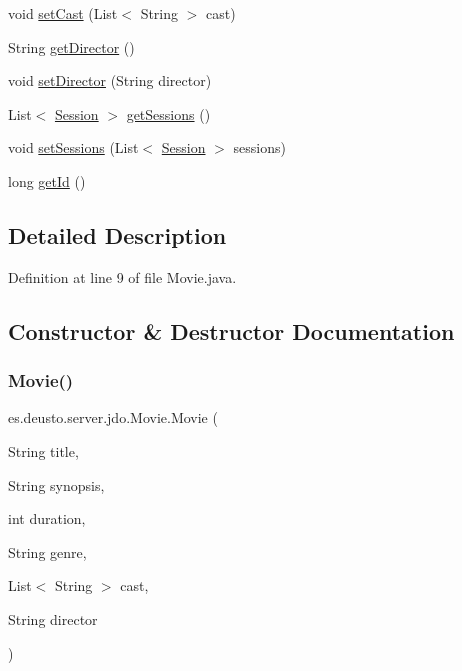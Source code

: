 \begin{DoxyCompactItemize}
\item 
void \mbox{\hyperlink{classes_1_1deusto_1_1server_1_1jdo_1_1_movie_aab7fa1af2944677769c47300ea061e3b}{set\+Cast}} (List$<$ String $>$ cast)
\item 
String \mbox{\hyperlink{classes_1_1deusto_1_1server_1_1jdo_1_1_movie_a4fae4f67472a1a789c1b926ce5417fe1}{get\+Director}} ()
\item 
void \mbox{\hyperlink{classes_1_1deusto_1_1server_1_1jdo_1_1_movie_a2739245f04bc6627b5a00ddeb6fba0fc}{set\+Director}} (String director)
\item 
List$<$ \mbox{\hyperlink{classes_1_1deusto_1_1server_1_1jdo_1_1_session}{Session}} $>$ \mbox{\hyperlink{classes_1_1deusto_1_1server_1_1jdo_1_1_movie_a8d94f72339ed5601515e139de313e181}{get\+Sessions}} ()
\item 
void \mbox{\hyperlink{classes_1_1deusto_1_1server_1_1jdo_1_1_movie_a76eb3668db335d824abc947053584699}{set\+Sessions}} (List$<$ \mbox{\hyperlink{classes_1_1deusto_1_1server_1_1jdo_1_1_session}{Session}} $>$ sessions)
\item 
long \mbox{\hyperlink{classes_1_1deusto_1_1server_1_1jdo_1_1_movie_a4d2758ed2b7a03bd95646f67c046e043}{get\+Id}} ()
\end{DoxyCompactItemize}


\subsection{Detailed Description}


Definition at line 9 of file Movie.\+java.



\subsection{Constructor \& Destructor Documentation}
\mbox{\label{classes_1_1deusto_1_1server_1_1jdo_1_1_movie_ab4223192a852a37abd679f4d0a6a11c4}} 
\subsubsection{\texorpdfstring{Movie()}{Movie()}\hspace{0.1cm}{\footnotesize\ttfamily [1/2]}}
{\footnotesize\ttfamily es.\+deusto.\+server.\+jdo.\+Movie.\+Movie (\begin{DoxyParamCaption}\item[{String}]{title,  }\item[{String}]{synopsis,  }\item[{int}]{duration,  }\item[{String}]{genre,  }\item[{List$<$ String $>$}]{cast,  }\item[{String}]{director }\end{DoxyParamCaption})}



